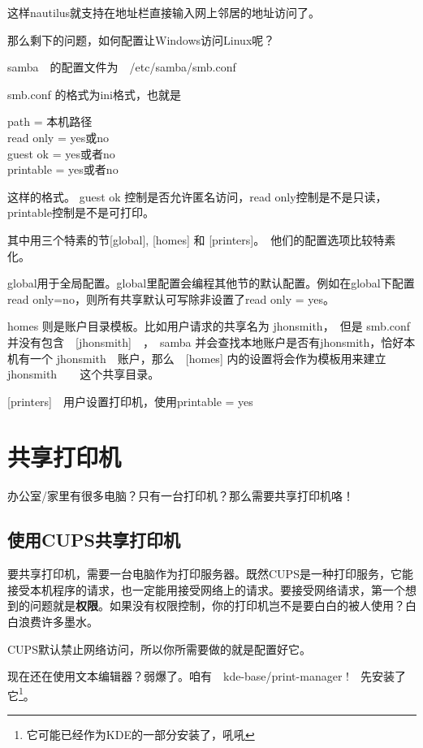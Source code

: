 这样nautilus就支持在地址栏直接输入网上邻居的地址访问了。

那么剩下的问题，如何配置让Windows访问Linux呢？

samba　的配置文件为　/etc/samba/smb.conf

smb.conf 的格式为ini格式，也就是

\begin{code}
[共享名]

path = 本机路径\\
read only = yes或no\\
guest ok = yes或者no\\
printable = yes或者no
\end{code}

这样的格式。
guest ok 控制是否允许匿名访问，read only控制是不是只读，printable控制是不是可打印。

其中用三个特素的节[global], [homes] 和 [printers]。　他们的配置选项比较特素化。

global用于全局配置。global里配置会编程其他节的默认配置。例如在global下配置　read only=no，则所有共享默认可写除非设置了read only = yes。

homes 则是账户目录模板。比如用户请求的共享名为 jhonsmith，　但是 smb.conf 并没有包含　[jhonsmith]　，　samba 并会查找本地账户是否有jhonsmith，恰好本机有一个 jhonsmith　账户，那么　[homes] 内的设置将会作为模板用来建立　 jhonsmith　　这个共享目录。

[printers]　用户设置打印机，使用printable = yes

\section{共享打印机}

办公室/家里有很多电脑？只有一台打印机？那么需要共享打印机咯！

\subsection{使用CUPS共享打印机}

要共享打印机，需要一台电脑作为打印服务器。既然CUPS是一种打印服务，它能接受本机程序的请求，也一定能用接受网络上的请求。要接受网络请求，第一个想到的问题就是\textbf{权限}。如果没有权限控制，你的打印机岂不是要白白的被人使用？白白浪费许多墨水。

CUPS默认禁止网络访问，所以你所需要做的就是配置好它。

现在还在使用文本编辑器？弱爆了。咱有　kde-base/print-manager !　先安装了它\footnote{它可能已经作为KDE的一部分安装了，吼吼}。

